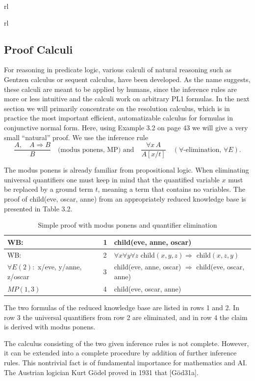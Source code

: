 \documentclass[10pt]{book}
\begin{document}
\begin{center}
\begin{tabular}{rl}
\begin{tabular}{rl}
\subsection{Proof Calculi}
For reasoning in predicate logic, various calculi of natural reasoning such as Gentzen calculus or sequent calculus, have been developed. As the name suggests, these calculi are meant to be applied by humans, since the inference rules are more or less intuitive and the calculi work on arbitrary PL1 formulas. In the next section we will primarily concentrate on the resolution calculus, which is in practice the most important efficient, automatizable calculus for formulas in conjunctive normal form. Here, using Example 3.2 on page 43 we will give a very small ``natural'' proof. We use the inference rule
\[
\frac{A, \quad A \Rightarrow B}{B} \quad \text{(modus ponens, MP) and} \quad \frac{\forall x\, A}{A[x/t]} \quad (\forall\text{-elimination, } \forall E).
\]

The modus ponens is already familiar from propositional logic. When eliminating universal quantifiers one must keep in mind that the quantified variable $x$ must be replaced by a ground term $t$, meaning a term that contains no variables. The proof of child(eve, oscar, anne) from an appropriately reduced knowledge base is presented in Table 3.2.

\begin{table}[ht]
\centering
\caption{Simple proof with modus ponens and quantifier elimination}
\begin{tabular}{lll}
\hline
WB: & 1 & child(eve, anne, oscar) \\
\hline
WB: & 2 & $\forall x \forall y \forall z$ child$(x, y, z) \Rightarrow$ child$(x, z, y)$ \\
\hline
$\forall E(2):$ x/eve, y/anne, z/oscar & 3 & child(eve, anne, oscar) $\Rightarrow$ child(eve, oscar, anne) \\
\hline
$MP(1,3)$ & 4 & child(eve, oscar, anne) \\
\hline
\end{tabular}
\end{table}
The two formulas of the reduced knowledge base are listed in rows 1 and 2. In row 3 the universal quantifiers from row 2 are eliminated, and in row 4 the claim is derived with modus ponens.

The calculus consisting of the two given inference rules is not complete. However, it can be extended into a complete procedure by addition of further inference rules. This nontrivial fact is of fundamental importance for mathematics and AI. The Austrian logician Kurt Gödel proved in 1931 that [Göd31a].


\end{tabular}
\end{tabular}
\end{center}
\end{document}
